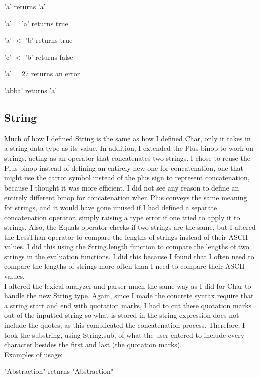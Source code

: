\documentclass{article}
\begin{document}
    'a' returns 'a'
 
    'a' = 'a' returns true
    
    'a' $<$ 'b' returns true
    
    'c' $<$ 'b' returns false
    
    'a' = 27 returns an error
    
    'abba' returns 'a'
    
\subsection*{String}
 Much of how I defined String is the same as how I defined Char, only it takes in a string data type as its value. In addition, I extended the Plus binop to work on strings, acting as an operator that concatenates two strings. I chose to reuse the Plus binop instead of defining an entirely new one for concatenation, one that might use the carrot symbol instead of the plus sign to represent concatenation, because I thought it was more efficient. I did not see any reason to define an entirely different binop for concatenation when Plus conveys the same meaning for strings, and it would have gone unused if I had defined a separate concatenation operator, simply raising a type error if one tried to apply it to strings. Also, the Equals operator checks if two strings are the same, but I altered the LessThan operator to compare the lengths of strings instead of their ASCII values. I did this using the String.length function to compare the lengths of two strings in the evaluation functions. I did this because I found that I often need to compare the lengths of strings more often than I need to compare their ASCII values.
 \newline
 \\ I altered the lexical analyzer and parser much the same way as I did for Char to handle the new String type. Again, since I made the concrete syntax require that a string start and end with quotation marks, I had to cut these quotation marks out of the inputted string so what is stored in the string expression does not include the quotes, as this complicated the concatenation process. Therefore, I took the substring, using String.sub, of what the user entered to include every character besides the first and last (the quotation marks).
 \newline
 \\ Examples of usage:
 
 "Abstraction" returns "Abstraction"
 
\end{document}
